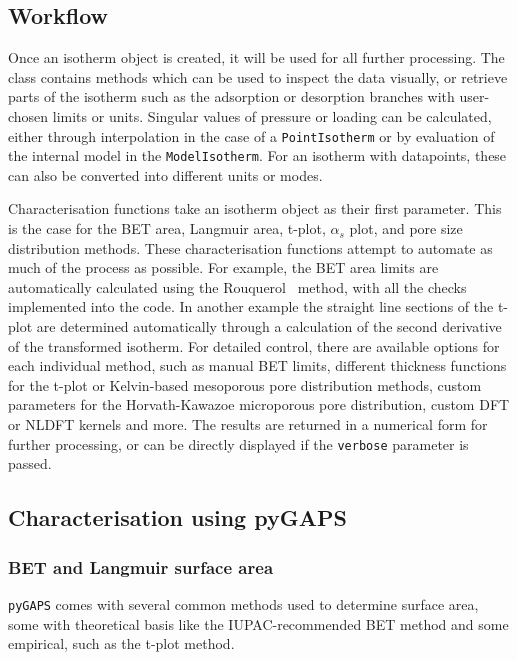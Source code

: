 \subsection{Workflow}

Once an isotherm object is created, it will be used for all 
further processing. The class contains methods which can be 
used to inspect the data visually, or retrieve
parts of the isotherm such as the adsorption or desorption branches with
user-chosen limits or units. Singular values of pressure or 
loading can be calculated, either through interpolation in the
case of a \texttt{PointIsotherm} or by evaluation
of the internal model in the \texttt{ModelIsotherm}. For an isotherm with
datapoints, these can also be converted into different units or modes.

Characterisation functions take an isotherm object as their
first parameter. This is the case for the BET area, Langmuir area, 
t-plot, \(\alpha_s\) plot, and pore size distribution methods.
These characterisation functions attempt to automate as much
of the process as possible. For example, the BET area limits are
automatically calculated using the 
Rouquerol~\cite{rouquerolAdsorptionPowdersPorous2013} method, 
with all the checks implemented into the code. In another example
the straight line sections of the t-plot are determined automatically
through a calculation of the second derivative of the transformed isotherm.
For detailed control, there are available options for each individual 
method, such as manual BET limits, different thickness functions for
the t-plot or Kelvin-based mesoporous pore distribution methods, 
custom parameters for the Horvath-Kawazoe microporous pore
distribution, custom DFT or NLDFT kernels and more. The results are
returned in a numerical form for further processing, or can be directly
displayed if the \texttt{verbose} parameter is passed.

\subsection{Characterisation using pyGAPS}

\subsubsection{BET and Langmuir surface area}

\texttt{pyGAPS} comes with several common methods used to
determine surface area, some with theoretical basis like
the IUPAC-recommended BET method and some empirical, such
as the t-plot method.

